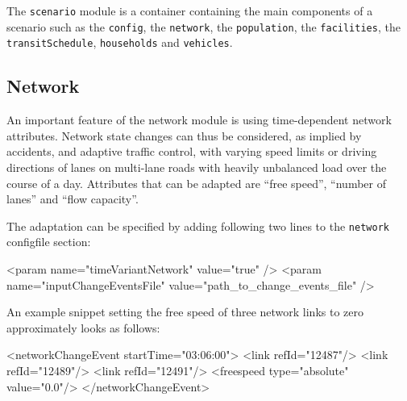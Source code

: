 The \lstinline|scenario| module is
a container containing the main components of a scenario such as the \lstinline|config|, the \lstinline|network|, the \lstinline|population|, the \lstinline|facilities|, the \lstinline|transitSchedule|, \lstinline|households| and \lstinline|vehicles|.



\subsection{Network}
\label{sec:extending-network}
An important feature of the network module is using time-dependent network attributes. Network state changes can thus be considered, as \eg implied by accidents, and adaptive traffic control, with varying speed limits or driving directions of lanes on multi-lane roads with heavily unbalanced load over the course of a day. Attributes that can be adapted are ``free speed'', ``number of lanes'' and ``flow capacity''.

The adaptation can be specified by adding following two lines to the \lstinline|network| \gls{configfile} section:
\begin{xml}
<param name="timeVariantNetwork" value="true" />
<param name="inputChangeEventsFile" value="path_to_change_events_file" />
\end{xml}
%
An example snippet setting the free speed of three network links to zero approximately looks as follows:
%
\begin{xml}
  <networkChangeEvent startTime="03:06:00">
    <link refId="12487"/>
    <link refId="12489"/>
    <link refId="12491"/>
    <freespeed type="absolute" value="0.0"/>
  </networkChangeEvent>
\end{xml}
%

